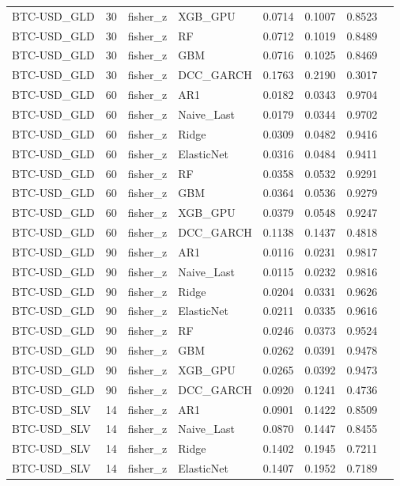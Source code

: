 \begin{table}[H]
\begin{tabular}{llllrrrr}
BTC-USD_GLD & 30 & fisher_z & XGB_GPU & 0.0714 & 0.1007 & 0.8523 &  \\
BTC-USD_GLD & 30 & fisher_z & RF & 0.0712 & 0.1019 & 0.8489 &  \\
BTC-USD_GLD & 30 & fisher_z & GBM & 0.0716 & 0.1025 & 0.8469 &  \\
BTC-USD_GLD & 30 & fisher_z & DCC_GARCH & 0.1763 & 0.2190 & 0.3017 &  \\
BTC-USD_GLD & 60 & fisher_z & AR1 & 0.0182 & 0.0343 & 0.9704 &  \\
BTC-USD_GLD & 60 & fisher_z & Naive_Last & 0.0179 & 0.0344 & 0.9702 &  \\
BTC-USD_GLD & 60 & fisher_z & Ridge & 0.0309 & 0.0482 & 0.9416 &  \\
BTC-USD_GLD & 60 & fisher_z & ElasticNet & 0.0316 & 0.0484 & 0.9411 &  \\
BTC-USD_GLD & 60 & fisher_z & RF & 0.0358 & 0.0532 & 0.9291 &  \\
BTC-USD_GLD & 60 & fisher_z & GBM & 0.0364 & 0.0536 & 0.9279 &  \\
BTC-USD_GLD & 60 & fisher_z & XGB_GPU & 0.0379 & 0.0548 & 0.9247 &  \\
BTC-USD_GLD & 60 & fisher_z & DCC_GARCH & 0.1138 & 0.1437 & 0.4818 &  \\
BTC-USD_GLD & 90 & fisher_z & AR1 & 0.0116 & 0.0231 & 0.9817 &  \\
BTC-USD_GLD & 90 & fisher_z & Naive_Last & 0.0115 & 0.0232 & 0.9816 &  \\
BTC-USD_GLD & 90 & fisher_z & Ridge & 0.0204 & 0.0331 & 0.9626 &  \\
BTC-USD_GLD & 90 & fisher_z & ElasticNet & 0.0211 & 0.0335 & 0.9616 &  \\
BTC-USD_GLD & 90 & fisher_z & RF & 0.0246 & 0.0373 & 0.9524 &  \\
BTC-USD_GLD & 90 & fisher_z & GBM & 0.0262 & 0.0391 & 0.9478 &  \\
BTC-USD_GLD & 90 & fisher_z & XGB_GPU & 0.0265 & 0.0392 & 0.9473 &  \\
BTC-USD_GLD & 90 & fisher_z & DCC_GARCH & 0.0920 & 0.1241 & 0.4736 &  \\
BTC-USD_SLV & 14 & fisher_z & AR1 & 0.0901 & 0.1422 & 0.8509 &  \\
BTC-USD_SLV & 14 & fisher_z & Naive_Last & 0.0870 & 0.1447 & 0.8455 &  \\
BTC-USD_SLV & 14 & fisher_z & Ridge & 0.1402 & 0.1945 & 0.7211 &  \\
BTC-USD_SLV & 14 & fisher_z & ElasticNet & 0.1407 & 0.1952 & 0.7189 &  \\

\end{tabular}
\end{table}
